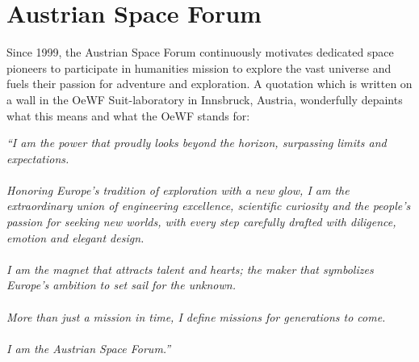 \chapter{Austrian Space Forum} \label{ap:oewf}
Since 1999, the Austrian Space Forum continuously motivates dedicated space pioneers to participate in humanities mission to explore the vast universe and fuels their passion for adventure and exploration. A quotation which is written on a wall in the OeWF Suit-laboratory in Innsbruck, Austria, wonderfully depaints what this means and what the OeWF stands for:

\begin{displayquote}
\textit{``I am the power that proudly looks beyond the horizon, surpassing limits and expectations.\\\\ Honoring Europe's tradition of exploration with a new glow, I am the extraordinary union of engineering excellence, scientific curiosity and the people's passion for seeking new worlds, with every step carefully drafted with diligence, emotion and elegant design.\\\\ I am the magnet that attracts talent and hearts; the maker that symbolizes Europe's ambition to set sail for the unknown.\\\\ More than just a mission in time, I define missions for generations to come.\\\\ I am the Austrian Space Forum.''}
\end{displayquote}

